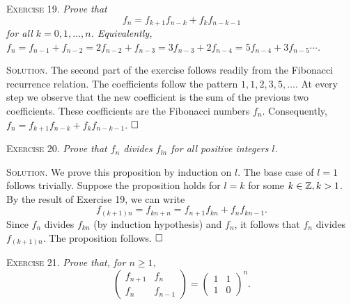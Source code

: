 \documentclass[11pt, leqno]{article}
\newcommand{\done}{\ensuremath{\hfill\square}}
\begin{document}
\textsc{Exercise 19}. \emph{Prove that 
\begin{displaymath}
f_n = f_{k+1}f_{n-k} + f_kf_{n-k-1}
\end{displaymath}
for all $k=0,1,\ldots, n$. Equivalently, $f_n = f_{n-1} + f_{n-2} = 2f_{n-2} + f_{n-3} = 3f_{n-3} + 2f_{n-4} = 5f_{n-4} + 3f_{n-5} \cdots$.}

\textsc{Solution}. The second part of the exercise follows readily from the Fibonacci recurrence relation. The coefficients follow the pattern $1, 1, 2, 3, 5, \ldots$. At every step we observe that the new coefficient is the sum of the previous two coefficients. These coefficients are the Fibonacci numbers $f_n$. Consequently, $f_n = f_{k+1}f_{n-k} + f_kf_{n-k-1}$. \done

\textsc{Exercise 20}. \emph{Prove that $f_n$ divides $f_{ln}$ for all positive integers $l$.}

\textsc{Solution}. We prove this proposition by induction on $l$. The base case of $l = 1$ follows trivially. Suppose the proposition holds for $l = k$ for some $k\in \mathbb{Z}, k>1$. By the result of Exercise 19, we can write 
\begin{displaymath}
  f_{(k+1)n} = f_{kn+n} = f_{n+1}f_{kn} + f_nf_{kn-1}. 
\end{displaymath}
Since $f_n$ divides $f_{kn}$ (by induction hypothesis) and $f_n$, it follows that $f_n$ divides $f_{(k+1)n}$. The proposition follows. \done

\textsc{Exercise 21}. \emph{Prove that, for $n\geq 1$, 
\begin{displaymath}
\begin{pmatrix} f_{n+1} & f_n \\ f_n & f_{n-1} \end{pmatrix} = \begin{pmatrix} 1 & 1 \\ 1 & 0 \end{pmatrix}^n.
\end{displaymath}}
\end{document}
